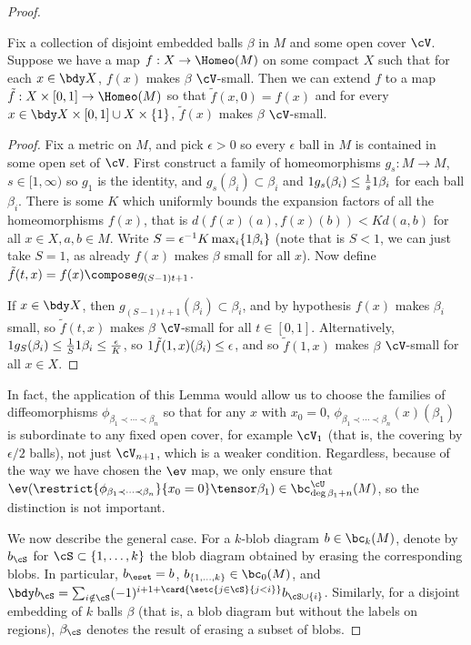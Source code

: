 \begin{proof}
\begin{lem}
\label{lem:extend-small-homeomorphisms}
Fix a collection of disjoint embedded balls $\beta$ in $M$ and some open cover $\cV$. Suppose we have a map $f :  X \to \Homeo(M)$ on some compact $X$ such that for each $x \in \bdy X$, $f(x)$ makes $\beta$ $\cV$-small. Then we can extend $f$ to a map $\tilde{f} : X \times [0,1] \to \Homeo(M)$ so that $\tilde{f}(x,0) = f(x)$ and for every $x \in \bdy X \times [0,1] \cup X \times \{1\}$, $\tilde{f}(x)$ makes $\beta$ $\cV$-small.
\end{lem}
\begin{proof}
Fix a metric on $M$, and pick $\epsilon > 0$ so every $\epsilon$ ball in $M$ is contained in some open set of $\cV$. First construct a family of homeomorphisms $g_s : M \to M$, $s \in [1,\infty)$ so $g_1$ is the identity, and $g_s(\beta_i) \subset \beta_i$ and $1 g_s(\beta_i) \leq \frac{1}{s} 1 \beta_i$ for each ball $\beta_i$. 
There is some $K$ which uniformly bounds the expansion factors of all the homeomorphisms $f(x)$, that is $d(f(x)(a), f(x)(b)) < K d(a,b)$ for all $x \in X, a,b \in M$. Write $S=\epsilon^{-1} K \max_i \{1 \beta_i\}$ (note that is $S<1$, we can just take $S=1$, as already $f(x)$ makes $\beta$ small for all $x$). Now define $\tilde{f}(t, x) = f(x) \compose g_{(S-1)t+1}$.

If $x \in \bdy X$, then $g_{(S-1)t+1}(\beta_i) \subset \beta_i$, and by hypothesis $f(x)$ makes $\beta_i$ small, so $\tilde{f}(t, x)$ makes $\beta$ $\cV$-small for all $t \in [0,1]$. Alternatively, $1 g_S(\beta_i) \leq \frac{1}{S} 1 \beta_i \leq \frac{\epsilon}{K}$, so $1 \tilde{f}(1,x)(\beta_i) \leq \epsilon$, and so $\tilde{f}(1,x)$ makes $\beta$ $\cV$-small for all $x \in X$.
\end{proof}

In fact, the application of this Lemma would allow us to choose the families of diffeomorphisms $\phi_{\beta_1 \prec \cdots \prec \beta_n}$ so that for any $x$ with $x_0 = 0$, $\phi_{\beta_1 \prec \cdots \prec \beta_n}(x)(\beta_1)$ is subordinate to any fixed open cover, for example $\cV_1$ (that is, the covering by $\epsilon/2$ balls), not just $\cV_{n+1}$, which is a weaker condition. Regardless, because of the way we have chosen the $\ev$ map, we only ensure that $\ev(\restrict{\phi_{\beta_1 \prec \cdots \prec \beta_n}}{x_0 = 0} \tensor \beta_1) \in \bc_{\deg \beta_1 + n}^{\cU}(M)$, so the distinction is not important.

We now describe the general case. For a $k$-blob diagram $b \in \bc_k(M)$, denote by $b_\cS$ for $\cS \subset \{1, \ldots, k\}$ the blob diagram obtained by erasing the corresponding blobs. In particular, $b_\eset = b$, $b_{\{1,\ldots,k\}} \in \bc_0(M)$, and $\bdy b_\cS = \sum_{i \notin \cS} (-1)^{i+1+\card{\setc{j \in \cS}{j < i}}}  b_{\cS \cup \{i\}}$.
Similarly, for a disjoint embedding of $k$ balls $\beta$ (that is, a blob diagram but without the labels on regions), $\beta_\cS$ denotes the result of erasing a subset of blobs. 


\end{proof}
